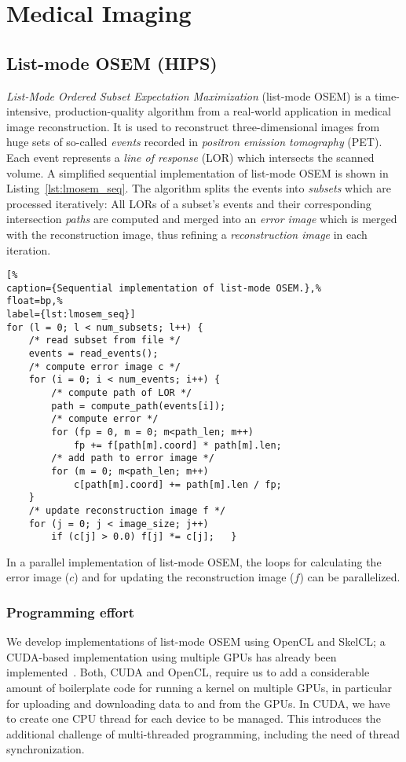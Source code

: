 \section{Medical Imaging}

\subsection{List-mode OSEM (HIPS)}

\emph{List-Mode Ordered Subset Expectation Maximization} (list-mode OSEM) is a time-intensive, production-quality algorithm from a real-world application in medical image reconstruction.
It is used to reconstruct three-dimensional images from huge sets of so-called \emph{events} recorded in \emph{positron emission tomography} (PET).
Each event represents a \emph{line of response} (LOR) which intersects the scanned volume.
A simplified sequential implementation of list-mode OSEM is shown in Listing~\ref{lst:lmosem_seq}.
The algorithm splits the events into \emph{subsets} which are processed iteratively:
All LORs of a subset's events and their corresponding intersection \emph{paths} are computed and merged into an \emph{error image} which is merged with the reconstruction image, thus refining a \emph{reconstruction image} in each iteration.

\begin{lstlisting}[%
caption={Sequential implementation of list-mode OSEM.},%
float=bp,%
label={lst:lmosem_seq}]
for	(l = 0; l < num_subsets; l++) {
	/* read subset from file */
	events = read_events();
	/* compute error image c */
	for	(i = 0; i < num_events; i++) {
		/* compute path of LOR */
		path = compute_path(events[i]);
		/* compute error */
		for	(fp = 0, m = 0; m<path_len; m++)
			fp += f[path[m].coord] * path[m].len;
		/* add path to error image */
		for (m = 0; m<path_len; m++)
			c[path[m].coord] += path[m].len / fp;
	}
	/* update reconstruction image f */
	for	(j = 0; j < image_size; j++)
		if (c[j] > 0.0) f[j] *= c[j];	}
\end{lstlisting}

In a parallel implementation of list-mode OSEM, the loops for calculating the error image ($c$) and for updating the reconstruction image ($f$) can be parallelized.

\subsubsection{Programming effort}

We develop implementations of list-mode OSEM using OpenCL and SkelCL; a CUDA-based implementation using multiple GPUs has already been implemented~\cite{ScVG-08}.
Both, CUDA and OpenCL, require us to add a considerable amount of boilerplate code for running a kernel on multiple GPUs, in particular for uploading and downloading data to and from the GPUs.
In CUDA, we have to create one CPU thread for each device to be managed.
This introduces the additional challenge of multi-threaded programming, including the need of thread synchronization.

